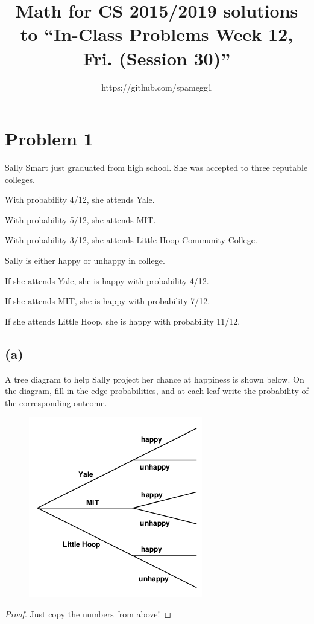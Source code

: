 \documentclass[14pt]{extarticle}
\title{Math for CS 2015/2019 solutions to ``In-Class Problems Week 12, Fri. (Session 30)''}
\author{https://github.com/spamegg1}
\begin{document}
\maketitle
\tableofcontents

\section{Problem 1}
Sally Smart just graduated from high school. She was accepted to three reputable colleges.

With probability 4/12, she attends Yale.

With probability 5/12, she attends MIT.

With probability 3/12, she attends Little Hoop Community College.

Sally is either happy or unhappy in college.

If she attends Yale, she is happy with probability 4/12.

If she attends MIT, she is happy with probability 7/12.

If she attends Little Hoop, she is happy with probability 11/12.

\subsection{(a)}
A tree diagram to help Sally project her chance at happiness is shown below. On the diagram, fill in the edge probabilities, and at each leaf write the probability of the corresponding outcome.

\begin{figure}[ht!]
\centering
\includegraphics[scale=0.75]{happy.png}
\end{figure}

\begin{proof}
Just copy the numbers from above!
\end{proof}
\end{document}
